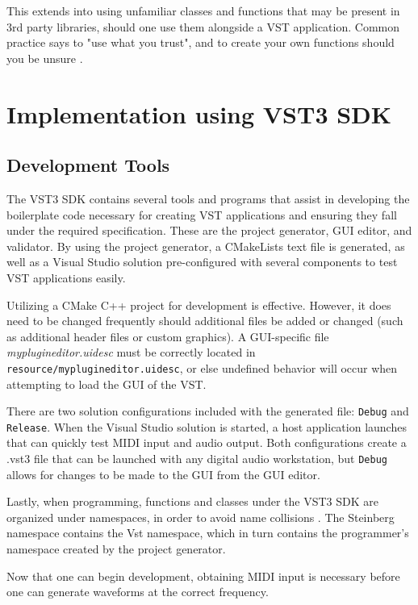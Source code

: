 \documentclass[12pt]{article}
\begin{document}
This extends into using unfamiliar classes and functions that may be present in 3rd party libraries, should one use them alongside a VST application. Common practice says to "use what you trust", and to create your own functions should you be unsure \cite{Goodlife}.

\newpage
\section{Implementation using VST3 SDK}

\subsection{Development Tools}
The VST3 SDK contains several tools and programs that assist in developing the boilerplate code necessary for creating VST applications and ensuring they fall under the required specification. These are the project generator, GUI editor, and validator. By using the project generator, a CMakeLists text file is generated, as well as a Visual Studio solution pre-configured with several components to test VST applications easily. 

Utilizing a CMake C++ project for development is effective. However, it does need to be changed frequently should additional files be added or changed (such as additional header files or custom graphics). A GUI-specific file \textit{myplugineditor.uidesc} must be correctly located in \verb*|resource/myplugineditor.uidesc|, or else undefined behavior will occur when attempting to load the GUI of the VST.

There are two solution configurations included with the generated file: \verb*|Debug| and \verb*|Release|. When the Visual Studio solution is started, a host application launches that can quickly test MIDI input and audio output. Both configurations create a .vst3 file that can be launched with any digital audio workstation, but \verb*|Debug| allows for changes to be made to the GUI from the GUI editor.

Lastly, when programming, functions and classes under the VST3 SDK are organized under namespaces, in order to avoid name collisions \cite{Pirkle_2015}. The Steinberg namespace contains the Vst namespace, which in turn contains the programmer's namespace created by the project generator. 

Now that one can begin development, obtaining MIDI input is necessary before one can generate waveforms at the correct frequency. 
\end{document}
